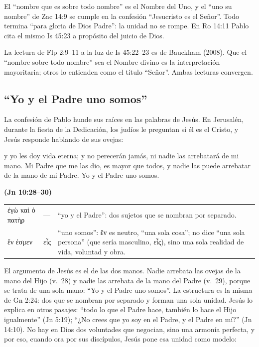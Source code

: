 \documentclass[11pt,letterpaper]{article}
\newcommand{\grc}[1]{\foreignlanguage{ancientgreek}{#1}}
\newcommand{\fuente}[1]{\par\hfill{\upshape\bfseries\small\textcolor{azul}{#1}}}
\begin{document}
El ``nombre que es sobre todo nombre'' es el Nombre del Uno, y el ``uno su nombre'' de Zac 14:9 se cumple en la confesión ``Jesucristo es el Señor''. Todo termina ``para gloria de Dios Padre'': la unidad no se rompe. En Ro 14:11 Pablo cita el mismo Is 45:23 a propósito del juicio de Dios.

\begin{nota}[Precisión]
La lectura de Flp 2:9--11 a la luz de Is 45:22--23 es de Bauckham (2008). Que el ``nombre sobre todo nombre'' sea el Nombre divino es la interpretación mayoritaria; otros lo entienden como el título ``Señor''. Ambas lecturas convergen.
\end{nota}

\subsection{``Yo y el Padre uno somos''}
La confesión de Pablo hunde sus raíces en las palabras de Jesús. En Jerusalén, durante la fiesta de la Dedicación, los judíos le preguntan si él es el Cristo, y Jesús responde hablando de sus ovejas:

\begin{cita}y yo les doy vida eterna; y no perecerán jamás, ni nadie las arrebatará de mi mano. Mi Padre que me las dio, es mayor que todos, y nadie las puede arrebatar de la mano de mi Padre. Yo y el Padre uno somos.\fuente{(Jn 10:28--30)}\end{cita}

\begin{filologia}[Jn 10:30]
\begin{tabular}{@{}L{3.4cm}L{1.6cm}L{9.8cm}@{}}
\grc{ἐγὼ καὶ ὁ πατὴρ} & --- & ``yo y el Padre'': dos sujetos que se nombran por separado. \\[2pt]
\grc{ἕν ἐσμεν} & \grc{εἷς} & ``uno somos'': \grc{ἕν} es neutro, ``una sola cosa''; no dice ``una sola persona'' (que sería masculino, \grc{εἷς}), sino una sola realidad de vida, voluntad y obra. \\
\end{tabular}
\end{filologia}

El argumento de Jesús es el de las dos manos. Nadie arrebata las ovejas de la mano del Hijo (v.~28) y nadie las arrebata de la mano del Padre (v.~29), porque se trata de una sola mano: ``Yo y el Padre uno somos''. La estructura es la misma de Gn 2:24: dos que se nombran por separado y forman una sola unidad. Jesús lo explica en otros pasajes: ``todo lo que el Padre hace, también lo hace el Hijo igualmente'' (Jn 5:19); ``¿No crees que yo soy en el Padre, y el Padre en mí?'' (Jn 14:10). No hay en Dios dos voluntades que negocian, sino una armonía perfecta, y por eso, cuando ora por sus discípulos, Jesús pone esa unidad como modelo:
\end{document}
